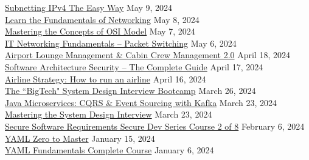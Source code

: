 \documentclass[10pt]{res} %
\begin{document}
\begin{resume}
\href{https://www.udemy.com/certificate/UC-5d923033-c49b-444b-8fab-f501e49c926e}{\color{blue}Subnetting IPv4 The Easy Way} \hfill May 9, 2024 \\
\href{https://www.udemy.com/certificate/UC-711fe0a9-9043-4b7e-a6a2-9d1c90431a8f}{\color{blue}Learn the Fundamentals of Networking} \hfill May 8, 2024 \\
\href{https://www.udemy.com/certificate/UC-6fab64a0-c983-4a91-9ef8-a274cc884af7}{\color{blue}Mastering the Concepts of OSI Model} \hfill May 7, 2024 \\
\href{https://www.udemy.com/certificate/UC-86982c26-4c33-44b0-af3c-fc0c8f9c9615}{\color{blue}IT Networking Fundamentals -- Packet Switching} \hfill May 6, 2024 \\
\href{https://www.udemy.com/certificate/UC-7b359f70-85c0-4b56-baf4-6c0883b19e3a}{\color{blue}Airport Lounge Management \& Cabin Crew Management 2.0} \hfill April 18, 2024 \\
\href{https://www.udemy.com/certificate/UC-02f95be2-e88e-44e1-9ddc-9f07f062f390}{\color{blue}Software Architecture Security -- The Complete Guide} \hfill April 17, 2024 \\
\href{https://www.udemy.com/certificate/UC-1b78e7e5-83ca-48f4-b595-67e3b97338b3}{\color{blue}Airline Strategy: How to run an airline} \hfill April 16, 2024 \\
\href{https://www.udemy.com/certificate/UC-46332552-d412-41e1-9161-987fe48c904f}{\color{blue}The ``BigTech" System Design Interview Bootcamp} \hfill March 26, 2024 \\
\href{https://www.udemy.com/certificate/UC-80d01155-3714-4213-adc8-b5a2c84c4573}{\color{blue}Java Microservices: CQRS \& Event Sourcing with Kafka} \hfill March 23, 2024 \\
\href{https://www.udemy.com/certificate/UC-8baeb260-f898-4e09-b3f3-8520aca097c0}{\color{blue}Mastering the System Design Interview} \hfill March 23, 2024 \\
\href{https://www.udemy.com/certificate/UC-994c108b-7e08-4109-9718-2b983131bfa7}{\color{blue}Secure Software Requirements Secure Dev Series Course 2 of 8} \hfill February 6, 2024 \\
\href{https://www.udemy.com/certificate/UC-f58d2a85-9b49-49b5-b78e-5ad7344504e4}{\color{blue}YAML Zero to Master} \hfill January 15, 2024 \\
\href{https://www.udemy.com/certificate/UC-6a893080-051c-422e-97b7-a0a23867ad0c}{\color{blue}YAML Fundamentals Complete Course} \hfill January 6, 2024 \\

\end{resume}
\end{document}
